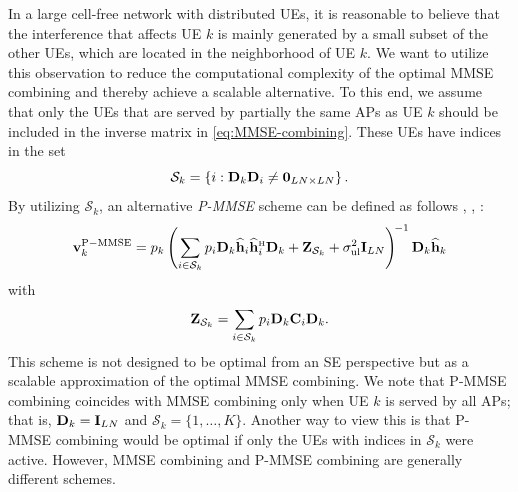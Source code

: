 In a large cell-free network with distributed UEs, it is reasonable to believe that the interference that affects UE $k$ is mainly generated by a small subset of the other UEs, which are located in the neighborhood of UE $k$. We want to utilize this observation to reduce the computational complexity of the optimal MMSE combining and thereby achieve a scalable alternative.
To this end, we assume that  only the UEs that are served by partially the same APs as UE $k$ should be included in the inverse matrix in \eqref{eq:MMSE-combining}. These UEs have indices in the set
\begin{equation} \label{eq:S_k}
\mathcal{S}_k = \left\{ i: \mathbf{D}_{k} \mathbf{D}_{i} \neq \mathbf{0}_{LN \times LN} \right\}.
\end{equation}
By utilizing $\mathcal{S}_k$, an alternative \emph{\gls{P-MMSE}} scheme can be defined as follows \cite{Attarifar2020a}, \cite{Bjornson2020a}, \cite{Nayebi2016a}:
\begin{equation} \label{eq:P-MMSE-combining}
\vect{v}_k^{{\rm P-MMSE}} =    p_k\left(\sum\limits_{i \in \mathcal {S}_k} p_{i}  \vect{D}_{k}\widehat{\vect{h}}_{i} \widehat{\vect{h}}_{i}^{\Htran}\vect{D}_{k} + {\bf{Z}}_{{\mathcal S}_k} + \sigmaUL  \vect{I}_{LN} \right)^{\!-1} \vect{{D}}_{k}\widehat{{\bf h}}_k
\end{equation}
with 
\begin{align}\label{eq:Z_k-prime}
{\bf{Z}}_{{\mathcal S}_k} 
= \sum\limits_{i \in \mathcal{S}_k} p_{i} \mathbf{{D}}_{k}
\mathbf{C}_{i} \mathbf{{D}}_{k}.
\end{align}
This scheme is not designed to be optimal from an SE perspective but as a scalable approximation of the optimal MMSE combining. We note that P-MMSE combining coincides with MMSE combining only when UE $k$ is served by all APs; that is, $\mathbf{D}_k=\mathbf{I}_{LN}$ and $\mathcal{S}_k=\{1,\ldots,K\}$.
Another way to view this is that P-MMSE combining would be optimal if only the UEs with indices in $\mathcal{S}_k$ were active. However, MMSE combining and P-MMSE combining are generally different schemes.


